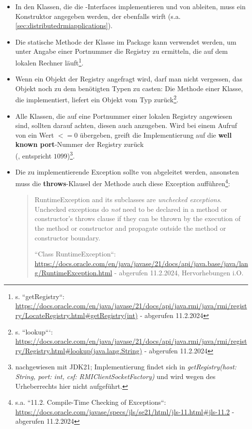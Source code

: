 \begin{itemize}
    \item In den Klassen, die die -Interfaces implementieren und von  ableiten, muss ein Konstruktor angegeben werden, der ebenfalls  wirft (s.a. \ref{sec:distributedrmiapplications}).
    \item Die statische Methode  der Klasse  im Package  kann verwendet werden, um unter Angabe einer Portnummer die Registry zu ermitteln, die auf dem lokalen Rechner läuft\footnote{
    s. ``getRegistry``: \url{https://docs.oracle.com/en/java/javase/21/docs/api/java.rmi/java/rmi/registry/LocateRegistry.html#getRegistry(int)} - abgerufen 11.2.2024
    }.
    \item Wenn ein Objekt der Registry angefragt wird, darf man nicht vergessen, das Objekt noch zu dem benötigten Typen zu casten:
    Die Methode  einer Klasse, die  implementiert, liefert ein Objekt vom Typ 
    zurück\footnote{
    s. ``lookup```: \url{https://docs.oracle.com/en/java/javase/21/docs/api/java.rmi/java/rmi/registry/Registry.html#lookup(java.lang.String)} - abgerufen 11.2.2024
    }.
    \item Alle Klassen, die auf eine Portnummer einer lokalen Registry angewiesen sind, sollten darauf achten, diesen auch anzugeben.
    Wird bei einem Aufruf von 
     ein Wert $<= 0$ übergeben, greift die Implementierung auf die \textbf{well known port}-Nummer der Registry zurück\\ (, entspricht $1099$)\footnote{
       nachgewiesen mit JDK21; Implementierung findet sich in \textit{getRegistry(host: String, port: int, csf: RMIClientSocketFactory)} und wird
    wegen des Urheberrechts hier nicht aufgeführt.
    }.
    \item Die zu implementierende Exception  sollte von  abgeleitet werden, ansonsten muss die \textbf{throws}-Klausel der Methode  auch diese Exception aufführen\footnote{
    s.a. ``11.2. Compile-Time Checking of Exceptions``: \url{https://docs.oracle.com/javase/specs/jls/se21/html/jls-11.html#jls-11.2} - abgerufen 11.2.2024
    }:
    \blockquote[{``Class RuntimeException``: \url{https://docs.oracle.com/en/java/javase/21/docs/api/java.base/java/lang/RuntimeException.html} - abgerufen 11.2.2024, Hervorhebungen i.O.}]{
        RuntimeException and its subclasses are \textit{unchecked exceptions}. Unchecked exceptions do \textit{not} need to be declared in a method or constructor's throws clause if they can be thrown by the execution of the method or constructor and propagate outside the method or constructor boundary.
    }

\end{itemize}


